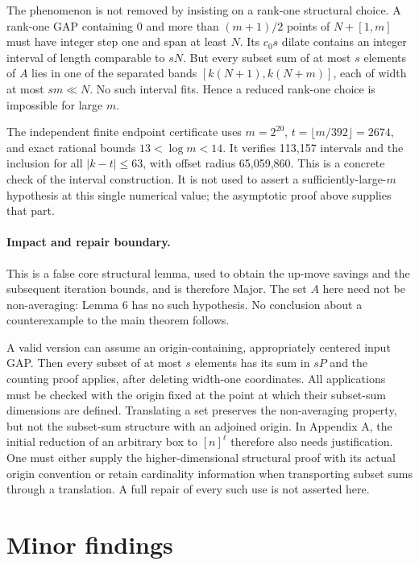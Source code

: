 \documentclass[10pt]{article}
\begin{document}
The phenomenon is not removed by insisting on a rank-one structural choice. A rank-one GAP containing \(0\) and more than \((m+1)/2\) points of \(N+[1,m]\) must have integer step one and span at least \(N\). Its \(c_0s\) dilate contains an integer interval of length comparable to \(sN\). But every subset sum of at most \(s\) elements of \(A\) lies in one of the separated bands \([k(N+1),k(N+m)]\), each of width at most \(sm\ll N\). No such interval fits. Hence a reduced rank-one choice is impossible for large \(m\).\par
The independent finite endpoint certificate uses \(m=2^{20}\), \(t=\lfloor m/392\rfloor=2674\), and exact rational bounds \(13<\log m<14\). It verifies 113,157 intervals and the inclusion for all \(|k-t|\le63\), with offset radius 65,059,860. This is a concrete check of the interval construction. It is not used to assert a sufficiently-large-\(m\) hypothesis at this single numerical value; the asymptotic proof above supplies that part.\par
\paragraph*{Impact and repair boundary.}\mbox{}\par
This is a false core structural lemma, used to obtain the up-move savings and the subsequent iteration bounds, and is therefore Major. The set \(A\) here need not be non-averaging: Lemma 6 has no such hypothesis. No conclusion about a counterexample to the main theorem follows.\par
A valid version can assume an origin-containing, appropriately centered input GAP. Then every subset of at most \(s\) elements has its sum in \(sP\) and the counting proof applies, after deleting width-one coordinates. All applications must be checked with the origin fixed at the point at which their subset-sum dimensions are defined. Translating a set preserves the non-averaging property, but not the subset-sum structure with an adjoined origin. In Appendix A, the initial reduction of an arbitrary box to \([n]^\ell\) therefore also needs justification. One must either supply the higher-dimensional structural proof with its actual origin convention or retain cardinality information when transporting subset sums through a translation. A full repair of every such use is not asserted here.\par
\section*{Minor findings}
\end{document}
